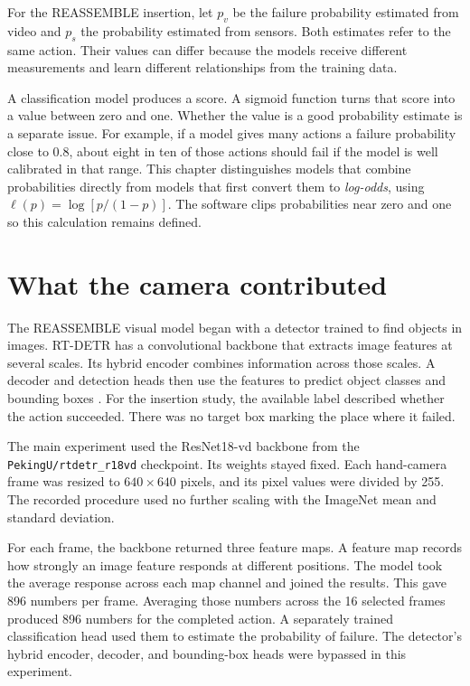 For the REASSEMBLE insertion, let \(p_v\) be the failure probability estimated from
video and \(p_s\) the probability estimated from sensors. Both estimates refer to the
same action. Their values can differ because the models receive different measurements
and learn different relationships from the training data.

A classification model produces a score. A sigmoid function turns that score into a
value between zero and one. Whether the value is a good probability estimate is a
separate issue. For example, if a model gives many actions a failure probability close
to 0.8, about eight in ten of those actions should fail if the model is well calibrated
in that range. This chapter distinguishes models that combine probabilities directly
from models that first convert them to \textit{log-odds}, using
\(\ell(p)=\log[p/(1-p)]\). The software clips probabilities near zero and one so this
calculation remains defined.

\section{What the camera contributed}

The REASSEMBLE visual model began with a detector trained to find objects in images.
RT-DETR has a convolutional backbone that extracts image features at several scales. Its
hybrid encoder combines information across those scales. A decoder and detection heads
then use the features to predict object classes and bounding boxes
\parencite{Zhao2024RTDETR}. For the insertion study, the available label described
whether the action succeeded. There was no target box marking the place where it failed.

The main experiment used the ResNet18-vd backbone from the
\texttt{PekingU/rtdetr\_r18vd} checkpoint. Its weights stayed fixed. Each hand-camera
frame was resized to \(640 \times 640\) pixels, and its pixel values were divided by
255. The recorded procedure used no further scaling with the ImageNet mean and standard
deviation.

For each frame, the backbone returned three feature maps. A feature map records how
strongly an image feature responds at different positions. The model took the average
response across each map channel and joined the results. This gave 896 numbers per
frame. Averaging those numbers across the 16 selected frames produced 896 numbers for
the completed action. A separately trained classification head used them to estimate the
probability of failure. The detector’s hybrid encoder, decoder, and bounding-box heads
were bypassed in this experiment.

